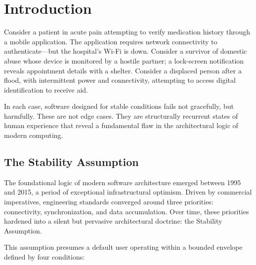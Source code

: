 \documentclass[acmsmall,review]{acmart}
\begin{document}


\maketitle

\section{Introduction}

Consider a patient in acute pain attempting to verify medication history through a mobile application. The application requires network connectivity to authenticate---but the hospital's Wi-Fi is down. Consider a survivor of domestic abuse whose device is monitored by a hostile partner; a lock-screen notification reveals appointment details with a shelter. Consider a displaced person after a flood, with intermittent power and connectivity, attempting to access digital identification to receive aid.

In each case, software designed for stable conditions fails not gracefully, but harmfully. These are not edge cases. They are structurally recurrent states of human experience that reveal a fundamental flaw in the architectural logic of modern computing.

\subsection{The Stability Assumption}

The foundational logic of modern software architecture emerged between 1995 and 2015, a period of exceptional infrastructural optimism. Driven by commercial imperatives, engineering standards converged around three priorities: connectivity, synchronization, and data accumulation. Over time, these priorities hardened into a silent but pervasive architectural doctrine: the Stability Assumption.

This assumption presumes a default user operating within a bounded envelope defined by four conditions:
\end{document}
